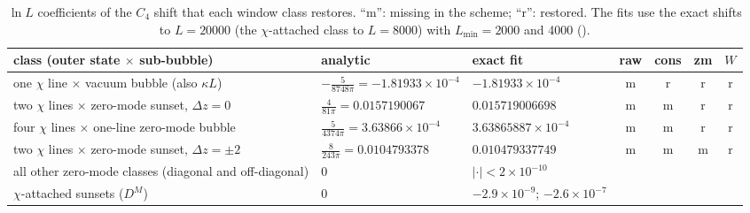 \begin{table}[ht]
\centering\footnotesize\renewcommand{\arraystretch}{1.15}
\begin{tabular}{@{}p{4.9cm}p{2.9cm}p{2.6cm}cccc@{}}
\toprule
class (outer state $\times$ sub-bubble) & analytic & exact fit & raw & cons & zm & $W$ \\\midrule
one $\chi$ line $\times$ vacuum bubble (also $\kappa L$) & $-\frac5{8748\pi}=-1.81933\times10^{-4}$ & $-1.81933\times10^{-4}$ & m & r & r & r \\
two $\chi$ lines $\times$ zero-mode sunset, $\Delta z=0$ & $\frac4{81\pi}=0.0157190067$ & $0.015719006698$ & m & m & r & r \\
four $\chi$ lines $\times$ one-line zero-mode bubble & $\frac5{4374\pi}=3.63866\times10^{-4}$ & $3.63865887\times10^{-4}$ & m & m & r & r \\
two $\chi$ lines $\times$ zero-mode sunset, $\Delta z=\pm2$ & $\frac8{243\pi}=0.0104793378$ & $0.010479337749$ & m & m & m & r \\
all other zero-mode classes (diagonal and off-diagonal) & 0 & $|\cdot|<2\times10^{-10}$ & & & & \\
$\chi$-attached sunsets ($D^M$) & 0 & $-2.9\times10^{-9}$; $-2.6\times10^{-7}$ & & & & \\
\bottomrule
\end{tabular}
\caption{$\ln L$ coefficients of the $C_4$ shift that each window class restores. ``m'': missing in the scheme; ``r'':
restored. The fits use the exact shifts to $L=20000$ (the $\chi$-attached class to $L=8000$) with $L_{\min}=2000$ and 4000
().}
\label{d2:tab:logs}
\end{table}

